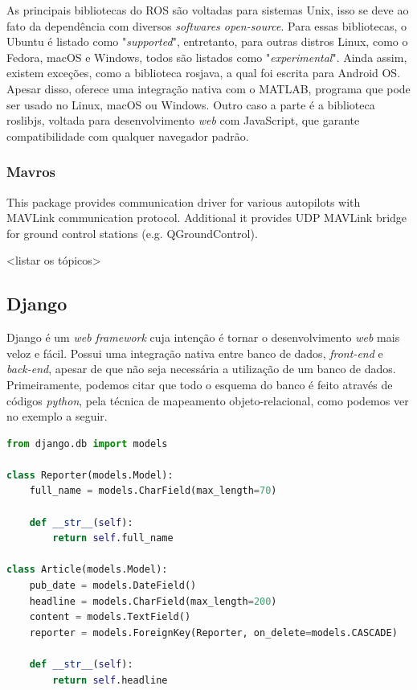 \documentclass[12pt,a4paper,oneside]{book}
\begin{document}
As principais bibliotecas do ROS são voltadas para sistemas
Unix, isso se deve ao fato da dependência com diversos
\textit{softwares open-source}. Para essas bibliotecas,
o Ubuntu é listado como "\textit{supported}", entretanto,
para outras distros Linux, como o Fedora, macOS e Windows,
todos são listados como "\textit{experimental}". Ainda assim,
existem exceções, como a biblioteca rosjava, a qual foi 
escrita para Android OS. Apesar disso, oferece uma integração
nativa com o MATLAB, programa que pode ser usado no Linux,
macOS ou Windows. Outro caso a parte é a biblioteca roslibjs,
voltada para desenvolvimento \textit{web} com JavaScript,
que garante compatibilidade com qualquer navegador padrão.

\subsubsection{Mavros}

This package provides communication driver for various autopilots with MAVLink communication protocol. Additional it provides UDP MAVLink bridge for ground control stations (e.g. QGroundControl).

<listar os tópicos>

\subsection{Django}

Django é um \textit{web framework} cuja intenção é tornar o desenvolvimento \textit{web} mais veloz e fácil. Possui uma integração nativa entre banco de dados, \textit{front-end} e \textit{back-end}, apesar de que não seja necessária a utilização de um banco de dados. Primeiramente, podemos citar que todo o esquema do banco é feito através de códigos \textit{python}, pela técnica de mapeamento objeto-relacional, como podemos ver no exemplo a seguir\cite{django}.

\begin{lstlisting}[language=Python]
from django.db import models

class Reporter(models.Model):
    full_name = models.CharField(max_length=70)

    def __str__(self):
        return self.full_name

class Article(models.Model):
    pub_date = models.DateField()
    headline = models.CharField(max_length=200)
    content = models.TextField()
    reporter = models.ForeignKey(Reporter, on_delete=models.CASCADE)

    def __str__(self):
        return self.headline
\end{lstlisting}
\end{document}

